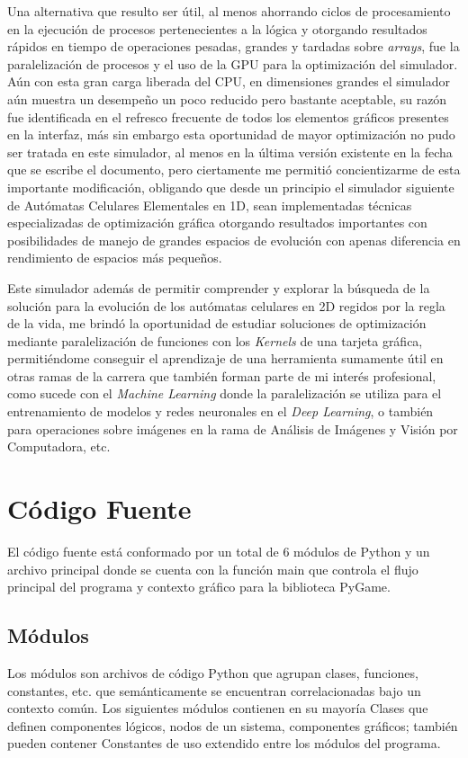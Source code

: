 \documentclass[]{article}
\begin{document}
	Una alternativa que resulto ser útil, al menos ahorrando ciclos de procesamiento en la ejecución de procesos pertenecientes a la lógica y otorgando resultados rápidos en tiempo de operaciones pesadas, grandes y tardadas sobre \textit{arrays}, fue la paralelización de procesos y el uso de la GPU para la optimización del simulador. Aún con esta gran carga liberada del CPU, en dimensiones grandes el simulador aún muestra un desempeño un poco reducido pero bastante aceptable, su razón fue identificada en el refresco frecuente de todos los elementos gráficos presentes en la interfaz, más sin embargo esta oportunidad de mayor optimización no pudo ser tratada en este simulador, al menos en la última versión existente en la fecha que se escribe el documento, pero ciertamente me permitió concientizarme de esta importante modificación, obligando que desde un principio el simulador siguiente de Autómatas Celulares Elementales en 1D, sean implementadas técnicas especializadas de optimización gráfica otorgando resultados importantes con posibilidades de manejo de grandes espacios de evolución con apenas diferencia en rendimiento de espacios más pequeños.
	
	Este simulador además de permitir comprender y explorar la búsqueda de la solución para la evolución de los autómatas celulares en 2D regidos por la regla de la vida, me brindó la oportunidad de estudiar soluciones de optimización mediante paralelización de funciones con los \textit{Kernels} de una tarjeta gráfica, permitiéndome conseguir el aprendizaje de una herramienta sumamente útil en otras ramas de la carrera que también forman parte de mi interés profesional, como sucede con el \textit{Machine Learning} donde la paralelización se utiliza para el entrenamiento de modelos y redes neuronales en el \textit{Deep Learning}, o también para operaciones sobre imágenes en la rama de Análisis de Imágenes y Visión por Computadora, etc. 

\newpage
\section{Código Fuente}
	El código fuente está conformado por un total de 6 módulos de Python y un archivo principal donde se cuenta con la función main que controla el flujo principal del programa y contexto gráfico para la biblioteca PyGame.
	
	\subsection{Módulos}
		Los módulos son archivos de código Python que agrupan clases, funciones, constantes, etc. que semánticamente se encuentran correlacionadas bajo un contexto común. Los siguientes módulos contienen en su mayoría Clases que definen componentes lógicos, nodos de un sistema, componentes gráficos; también pueden contener Constantes de uso extendido entre los módulos del programa.
		
\end{document}
